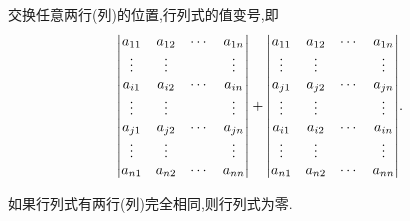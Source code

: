 \documentclass[9pt,a4paper]{book}
\begin{document}
\begin{feature}
	交换任意两行(列)的位置,行列式的值变号,即\[ {\begin{vmatrix}
		{{a_{11}}}&{{a_{12}}}& \cdots &{{a_{1n}}}\\
		\vdots & \vdots &{\rm{ }}& \vdots \\
		{{a_{i1}}}&{{a_{i2}}}& \cdots &{{a_{in}}}\\
		\vdots & \vdots &{\rm{ }}& \vdots \\
		{{a_{j1}}}&{{a_{j2}}}& \cdots &{{a_{jn}}}\\
		\vdots & \vdots &{\rm{ }}& \vdots \\
		{{a_{n1}}}&{{a_{n2}}}& \cdots &{{a_{nn}}}
		\end{vmatrix}}  +  {\begin{vmatrix}
		{{a_{11}}}&{{a_{12}}}& \cdots &{{a_{1n}}}\\
		\vdots & \vdots &{\rm{ }}& \vdots \\
		{{a_{j1}}}&{{a_{j2}}}& \cdots &{{a_{jn}}}\\
		\vdots & \vdots &{\rm{ }}& \vdots \\
		{{a_{i1}}}&{{a_{i2}}}& \cdots &{{a_{in}}}\\
		\vdots & \vdots &{\rm{ }}& \vdots \\
		{{a_{n1}}}&{{a_{n2}}}& \cdots &{{a_{nn}}}
		\end{vmatrix}} .\]
\end{feature}
\begin{feature}
	如果行列式有两行(列)完全相同,则行列式为零.
\end{feature}
\end{document}
